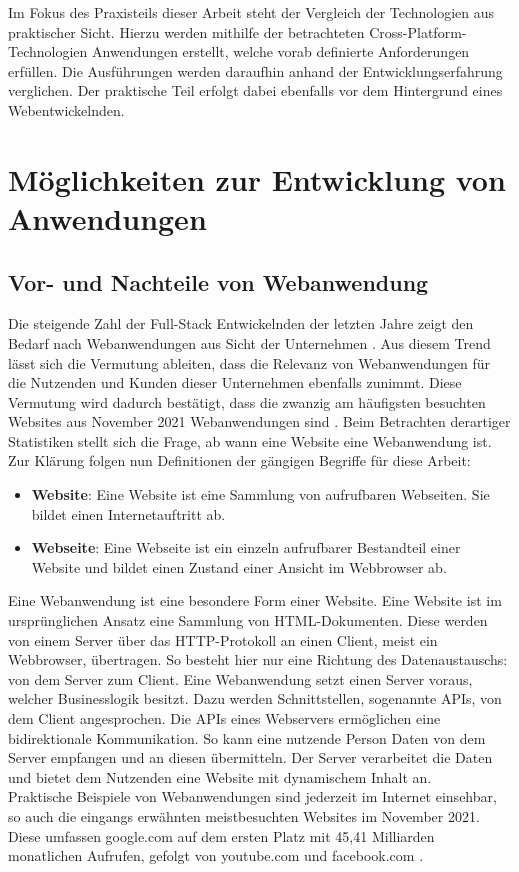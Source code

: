 \documentclass[a4paper]{scrartcl}
\begin{document}
 Im Fokus des Praxisteils dieser Arbeit steht der Vergleich der Technologien aus praktischer Sicht. Hierzu werden mithilfe der betrachteten Cross-Platform-Technologien Anwendungen erstellt, welche vorab definierte Anforderungen erfüllen. Die Ausführungen werden daraufhin anhand der Entwicklungserfahrung verglichen. Der praktische Teil erfolgt dabei ebenfalls vor dem Hintergrund eines Webentwickelnden.  

\newpage

\section{Möglichkeiten zur Entwicklung von Anwendungen}

\subsection{Vor- und Nachteile von Webanwendung}

Die steigende Zahl der Full-Stack Entwickelnden der letzten Jahre zeigt den Bedarf nach Webanwendungen aus Sicht der Unternehmen \autocite{stackoverflow_2020}. Aus diesem Trend lässt sich die Vermutung ableiten, dass die Relevanz von Webanwendungen für die Nutzenden und Kunden dieser Unternehmen ebenfalls zunimmt. Diese Vermutung wird dadurch bestätigt, dass die zwanzig am häufigsten besuchten Websites aus November 2021 Webanwendungen sind \autocite{Clement}. Beim Betrachten derartiger Statistiken stellt sich die Frage, ab wann eine Website eine Webanwendung ist. Zur Klärung folgen nun Definitionen der gängigen Begriffe für diese Arbeit: 

\begin{itemize}
	\item[] \textbf{Website}: Eine Website ist eine Sammlung von aufrufbaren Webseiten. Sie bildet einen Internetauftritt ab.
	\item[] \textbf{Webseite}: Eine Webseite ist ein einzeln aufrufbarer Bestandteil einer Website und bildet einen Zustand einer Ansicht im Webbrowser ab.
\end{itemize}

Eine Webanwendung ist eine besondere Form einer Website. Eine Website ist im ursprünglichen Ansatz eine Sammlung von HTML-Dokumenten. Diese werden von einem Server über das HTTP-Protokoll an einen Client, meist ein Webbrowser, übertragen. So besteht hier nur eine Richtung des Datenaustauschs: von dem Server zum Client. Eine Webanwendung setzt einen Server voraus, welcher Businesslogik besitzt. Dazu werden Schnittstellen, sogenannte APIs, von dem Client angesprochen. Die APIs eines Webservers ermöglichen eine bidirektionale Kommunikation. So kann eine nutzende Person Daten von dem Server empfangen und an diesen übermitteln. Der Server verarbeitet die Daten und bietet dem Nutzenden eine Website mit dynamischem Inhalt an. \\
Praktische Beispiele von Webanwendungen sind jederzeit im Internet einsehbar, so auch die eingangs erwähnten meistbesuchten Websites im November 2021. Diese umfassen google.com auf dem ersten Platz mit 45,41 Milliarden monatlichen Aufrufen, gefolgt von youtube.com und facebook.com \autocite{Clement}. \\
\end{document}
